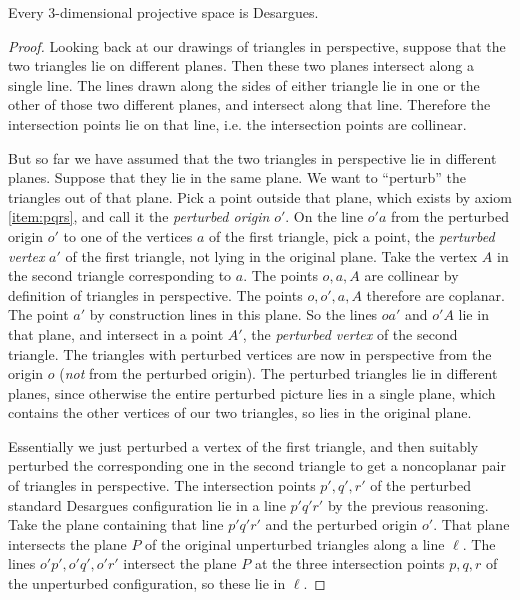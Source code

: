 \begin{lemma}
Every 3-dimensional projective space is Desargues.
\end{lemma}
\begin{proof}
Looking back at our drawings of triangles in perspective, suppose that the two triangles lie on different planes.
Then these two planes intersect along a single line.
The lines drawn along the sides of either triangle lie in one or the other of those two different planes, and intersect along that line.
Therefore the intersection points lie on that line, i.e. the intersection points are collinear.

But so far we have assumed that the two triangles in perspective lie in different planes.
Suppose that they lie in the same plane.
We want to ``perturb'' the triangles out of that plane.
Pick a point outside that plane, which exists by axiom \ref{item:pqrs}, and call it the \emph{perturbed origin} \(o'\).
On the line \(o'a\) from the perturbed origin \(o'\) to one of the vertices \(a\) of the first triangle, pick a point, the \emph{perturbed vertex} \(a'\) of the first triangle, not lying in the original plane.
Take the vertex \(A\) in the second triangle corresponding to \(a\).
The points \(o, a, A\) are collinear by definition of triangles in perspective.
The points \(o, o', a, A\) therefore are coplanar.
The point \(a'\) by construction lines in this plane.
So the lines \(oa'\) and \(o'A\) lie in that plane, and intersect in a point \(A'\), the \emph{perturbed vertex} of the second triangle.
The triangles with perturbed vertices are now in perspective from the origin \(o\) (\emph{not} from the perturbed origin).
The perturbed triangles lie in different planes, since otherwise the entire perturbed picture lies in a single plane, which contains the other vertices of our two triangles, so lies in the original plane.

Essentially we just perturbed a vertex of the first triangle, and then suitably perturbed the corresponding one in the second triangle to get a noncoplanar pair of triangles in perspective.
The intersection points \(p', q', r'\) of the perturbed standard Desargues configuration lie in a line \(p'q'r'\) by the previous reasoning.
Take the plane containing that line \(p'q'r'\) and the perturbed origin \(o'\).
That plane intersects the plane \(P\) of the original unperturbed triangles along a line \(\ell\).
The lines \(o'p', o'q', o'r'\) intersect the plane \(P\) at the three intersection points \(p, q, r\) of the unperturbed configuration, so these lie in \(\ell\).
\end{proof}

